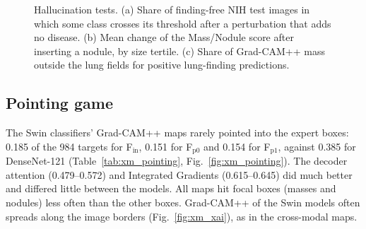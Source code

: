 \begin{table}[htbp]
\centering\small
\caption{Hallucination tests on the \num{9861} finding-free NIH test images: share with some class above its threshold on the clean image,
share flipped by each perturbation, inserted-nodule sensitivity and the share of Grad-CAM++ mass outside the lung fields.}
\label{tab:xm_halluc}
\end{table}

\begin{table}[htbp]
\centering\small
\caption{Counterfactual nodules: mean change of the Mass/Nodule score after insertion, by nodule-size tertile.}
\label{tab:xm_nodule}
\end{table}

\begin{figure}[htbp]
\centering
{}
\caption{Hallucination tests. (a) Share of finding-free NIH test images in which some class crosses its threshold after a perturbation
that adds no disease. (b) Mean change of the Mass/Nodule score after inserting a nodule, by size tertile. (c) Share of Grad-CAM++ mass
outside the lung fields for positive lung-finding predictions.}
\label{fig:xm_halluc}
\end{figure}

\subsection{Pointing game}
\label{sec:xm_res_pointing}
The Swin classifiers' Grad-CAM++ maps rarely pointed into the expert boxes: 0.185 of the 984 targets for F$_\mathrm{in}$, 0.151 for
F$_\mathrm{p0}$ and 0.154 for F$_\mathrm{p1}$, against 0.385 for DenseNet-121 (Table~\ref{tab:xm_pointing}, Fig.~\ref{fig:xm_pointing}).
The decoder attention (0.479--0.572) and Integrated Gradients (0.615--0.645) did much better and differed little between the models. All
maps hit focal boxes (masses and nodules) less often than the other boxes. Grad-CAM++ of the Swin models often spreads along the image
borders (Fig.~\ref{fig:xm_xai}), as in the cross-modal maps.

\begin{table}[htbp]
\centering\small
\caption{Pointing game on the 984 NIH expert boxes (164 focal: Mass, Nodule): hit rate averaged over the five seeds, with a 95\,\%
image-cluster bootstrap interval (descriptive).}
\label{tab:xm_pointing}
\end{table}

